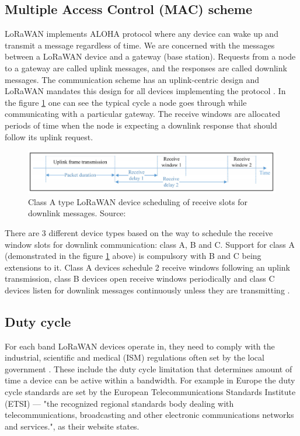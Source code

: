 \subsection{Multiple Access Control (MAC) scheme}

LoRaWAN implements ALOHA protocol where any device can wake up and transmit a message regardless of time. We are concerned with the messages between a LoRaWAN device and a gateway (base station). Requests from a node to a gateway are called uplink messages, and the responses are called downlink messages.  
The communication scheme has an uplink-centric design and 
LoRaWAN mandates this design for all devices implementing the protocol \cite{simulator}. In the figure \ref{fig:class A} one can see the typical cycle a node goes through while communicating with a particular gateway. The receive windows are allocated periods of time when the node is expecting 
a downlink response that should follow its uplink request.

\begin{figure}[h!]
  \centering
  \includegraphics[scale=0.5]{figures/class A.PNG}
  \caption{Class A type LoRaWAN device scheduling of receive slots for downlink messages. Source: \cite{doppler}}
  \label{fig:class A}
\end{figure}

There are 3 different device types based on the way to schedule the receive window slots for downlink communication: class A, B and C. Support for class A (demonstrated in the figure \ref{fig:class A} above) is compulsory with B and C being extensions to it. Class A devices schedule 2 receive windows following an uplink transmission, class B devices open receive windows periodically and class C devices listen for downlink messages continuously unless they are transmitting \cite{lora_alliance_spec}. 

\subsection{Duty cycle}
For each band LoRaWAN devices operate in, they need to comply with the industrial, scientific and medical (ISM) regulations often set by the local government \cite{duty_cycle}. These include the duty cycle limitation that determines amount of time a device can be active within a bandwidth. For example in Europe the duty cycle standards are set by the 
European Telecommunications Standards Institute (ETSI) —  "the recognized regional standards body dealing with telecommunications, broadcasting and other electronic communications networks and services.", as their website  \cite{about_etsi} states.\\ 

